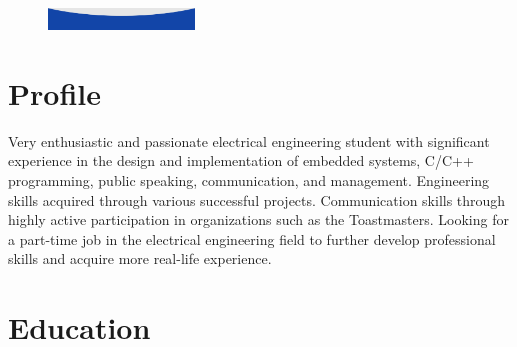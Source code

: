 \documentclass[lighthipster]{simplehipstercv}
\begin{document}
\begin{paracol}{2}
{\begin{minipage}[t][0.92\textheight]{0.288\textwidth}
\begin{tabular}{@{}l l}
	\end{tabular}
\end{minipage}

\begin{figure}[b]
	\center
	\includegraphics[width=0.347\textwidth]{figures/bottom.png}
\end{figure}

}
\switchcolumn

\normalsize

\begin{minipage}[t]{0.60\textwidth}

	\normalsize
	\vspace{22px}

	\section*{Profile}
	\vspace{2mm}

	\phantom{aa} 
	Very enthusiastic and passionate electrical engineering student with significant 
	experience in the design and implementation of embedded systems, C/C++ programming,
	public speaking, communication, and management. Engineering skills acquired through 
	various successful projects. Communication skills through highly active participation
	in organizations such as the Toastmasters. Looking for a part-time job in the 
	electrical engineering field to further develop professional skills and acquire more 
	real-life experience.

	\bigskip

	\section*{Education}
	\begin{tabular}{@{}l c @{}r}


\end{tabular}
\end{minipage}
\end{paracol}
\end{document}
